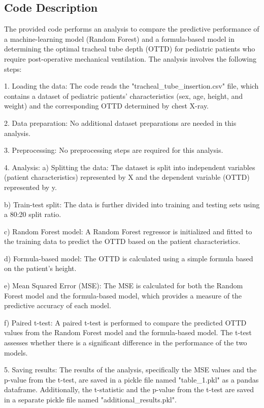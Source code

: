 \documentclass[11pt]{article}
\begin{document}
\subsection{Code Description}

The provided code performs an analysis to compare the predictive performance of a machine-learning model (Random Forest) and a formula-based model in determining the optimal tracheal tube depth (OTTD) for pediatric patients who require post-operative mechanical ventilation. The analysis involves the following steps:

1. Loading the data: The code reads the "tracheal\_tube\_insertion.csv" file, which contains a dataset of pediatric patients' characteristics (sex, age, height, and weight) and the corresponding OTTD determined by chest X-ray.

2. Data preparation: No additional dataset preparations are needed in this analysis.

3. Preprocessing: No preprocessing steps are required for this analysis.

4. Analysis:
   a) Splitting the data: The dataset is split into independent variables (patient characteristics) represented by X and the dependent variable (OTTD) represented by y.
   
   b) Train-test split: The data is further divided into training and testing sets using a 80:20 split ratio.
   
   c) Random Forest model: A Random Forest regressor is initialized and fitted to the training data to predict the OTTD based on the patient characteristics.
   
   d) Formula-based model: The OTTD is calculated using a simple formula based on the patient's height.
   
   e) Mean Squared Error (MSE): The MSE is calculated for both the Random Forest model and the formula-based model, which provides a measure of the predictive accuracy of each model.
   
   f) Paired t-test: A paired t-test is performed to compare the predicted OTTD values from the Random Forest model and the formula-based model. The t-test assesses whether there is a significant difference in the performance of the two models.
   
5. Saving results: The results of the analysis, specifically the MSE values and the p-value from the t-test, are saved in a pickle file named "table\_1.pkl" as a pandas dataframe. Additionally, the t-statistic and the p-value from the t-test are saved in a separate pickle file named "additional\_results.pkl".
\end{document}
